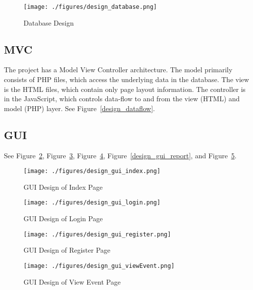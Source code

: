   \begin{figure}[tbh]
\begin{center}
\texttt{[image: ./figures/design\_database.png]}
\end{center}
\caption{Database Design \label{design_database}}
\end{figure}
 
 \subsection{MVC} The project has a Model View Controller architecture. The model primarily consists of PHP files, which access the underlying data in the database. The view is the HTML files, which contain only page layout information. The controller is in the JavaScript, which controls data-flow to and from the view (HTML) and model (PHP) layer. See Figure~\ref{design_dataflow}.
 
 \subsection{GUI} See Figure~\ref{design_gui_index}, Figure~\ref{design_gui_login}, Figure~\ref{design_gui_register}, Figure~\ref{design_gui_report}, and Figure~\ref{design_gui_viewEvent}.
 
 \begin{figure}[!htbp]
\begin{center}
\texttt{[image: ./figures/design\_gui\_index.png]}
\end{center}
\caption{GUI Design of Index Page \label{design_gui_index}}
\end{figure}

 \begin{figure}[!htbp]
\begin{center}
\texttt{[image: ./figures/design\_gui\_login.png]}
\end{center}
\caption{GUI Design of Login Page \label{design_gui_login}}
\end{figure}

 \begin{figure}[!htbp]
\begin{center}
\texttt{[image: ./figures/design\_gui\_register.png]}
\end{center}
\caption{GUI Design of Register Page \label{design_gui_register}}
\end{figure}

\begin{figure}[!htbp]
\begin{center}
\texttt{[image: ./figures/design\_gui\_viewEvent.png]}
\end{center}
\caption{GUI Design of View Event Page \label{design_gui_viewEvent}}
\end{figure}

